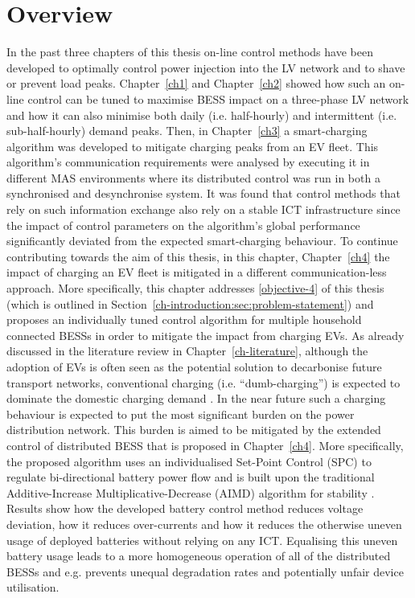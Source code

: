 \section{Overview}
\label{ch4:sec:overview}

In the past three chapters of this thesis on-line control methods have been developed to optimally control power injection into the LV network and to shave or prevent load peaks.
Chapter~\ref{ch1} and Chapter~\ref{ch2} showed how such an on-line control can be tuned to maximise BESS impact on a three-phase LV network and how it can also minimise both daily (i.e. half-hourly) and intermittent (i.e. sub-half-hourly) demand peaks.
Then, in Chapter~\ref{ch3} a smart-charging algorithm was developed to mitigate charging peaks from an EV fleet.
This algorithm's communication requirements were analysed by executing it in different MAS environments where its distributed control was run in both a synchronised and desynchronise system.
It was found that control methods that rely on such information exchange also rely on a stable ICT infrastructure since the impact of control parameters on the algorithm's global performance significantly deviated from the expected smart-charging behaviour.
To continue contributing towards the aim of this thesis, in this chapter, Chapter~\ref{ch4} the impact of charging an EV fleet is mitigated in a different communication-less approach.
More specifically, this chapter addresses \ref{objective-4} of this thesis (which is outlined in Section~\ref{ch-introduction:sec:problem-statement}) and proposes an individually tuned control algorithm for multiple household connected BESSs in order to mitigate the impact from charging EVs.
As already discussed in the literature review in Chapter~\ref{ch-literature}, although the adoption of EVs is often seen as the potential solution to decarbonise future transport networks, conventional charging (i.e. ``dumb-charging'') is expected to dominate the domestic charging demand \cite{Shah2015}.
In the near future such a charging behaviour is expected to put the most significant burden on the power distribution network.
This burden is aimed to be mitigated by the extended control of distributed BESS that is proposed in Chapter~\ref{ch4}.
More specifically, the proposed algorithm uses an individualised Set-Point Control (SPC) to regulate bi-directional battery power flow and is built upon the traditional Additive-Increase Multiplicative-Decrease (AIMD) algorithm for stability \cite{Chiu1989}.
Results show how the developed battery control method reduces voltage deviation, how it reduces over-currents and how it reduces the otherwise uneven usage of deployed batteries without relying on any ICT.
Equalising this uneven battery usage leads to a more homogeneous operation of all of the distributed BESSs and e.g. prevents unequal degradation rates and potentially unfair device utilisation.

